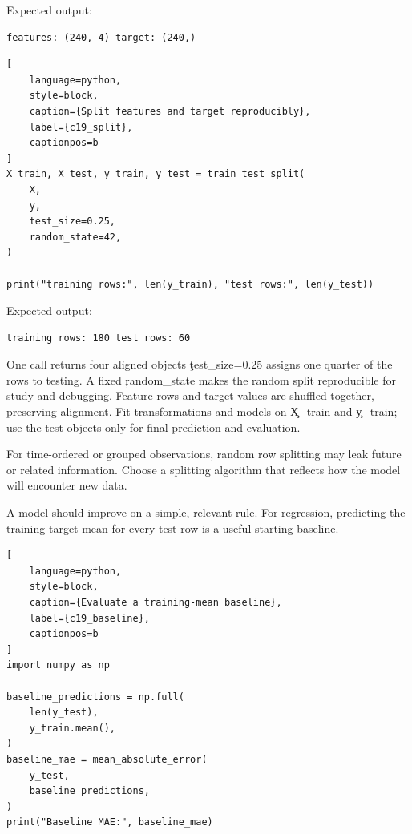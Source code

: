 Expected output:

\begin{lstlisting}[language=text, style=block, caption={240 samples described by four features}, label={c19_dataset_output}, captionpos=b]
features: (240, 4) target: (240,)
\end{lstlisting}

\begin{lstlisting}[
    language=python,
    style=block,
    caption={Split features and target reproducibly},
    label={c19_split},
    captionpos=b
]
X_train, X_test, y_train, y_test = train_test_split(
    X,
    y,
    test_size=0.25,
    random_state=42,
)

print("training rows:", len(y_train), "test rows:", len(y_test))
\end{lstlisting}

Expected output:

\begin{lstlisting}[language=text, style=block, caption={One quarter of the rows are set aside}, label={c19_split_output}, captionpos=b]
training rows: 180 test rows: 60
\end{lstlisting}

\begin{SyntaxBox}{One call returns four aligned objects}
\c{test_size=0.25} assigns one quarter of the rows to testing. A fixed
\c{random_state} makes the random split reproducible for study and debugging.
Feature rows and target values are shuffled together, preserving alignment.
Fit transformations and models on \c{X_train} and \c{y_train}; use the test
objects only for final prediction and evaluation.
\end{SyntaxBox}

For time-ordered or grouped observations, random row splitting may leak future
or related information. Choose a splitting algorithm that reflects how the
model will encounter new data.


A model should improve on a simple, relevant rule. For regression, predicting
the training-target mean for every test row is a useful starting baseline.

\begin{lstlisting}[
    language=python,
    style=block,
    caption={Evaluate a training-mean baseline},
    label={c19_baseline},
    captionpos=b
]
import numpy as np

baseline_predictions = np.full(
    len(y_test),
    y_train.mean(),
)
baseline_mae = mean_absolute_error(
    y_test,
    baseline_predictions,
)
print("Baseline MAE:", baseline_mae)
\end{lstlisting}

